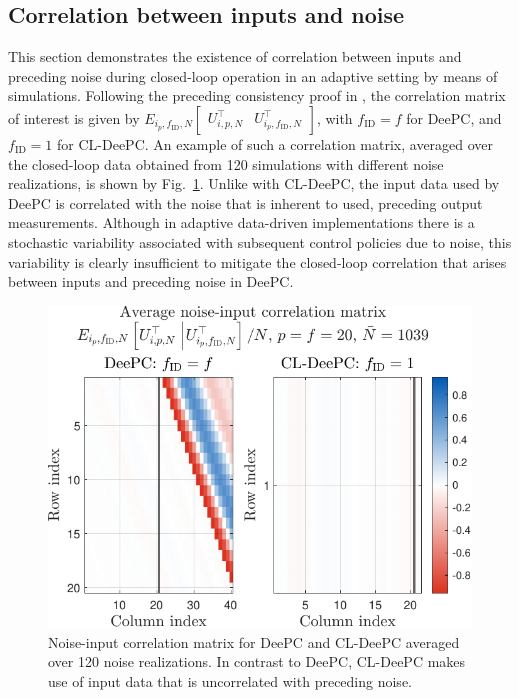 \subsection{Correlation between inputs and noise}
\noindent This section demonstrates the existence of correlation between inputs and preceding noise during closed-loop operation in an adaptive setting by means of simulations. Following the preceding consistency proof in , the correlation matrix of interest is given by $E_{i_p,f_\mathrm{ID},N}\begin{bmatrix}U_{i,p,N}^\top & U_{i_p,f_\mathrm{ID},N}^\top\end{bmatrix}$, with $f_\mathrm{ID}=f$ for \ac{DeePC}, and $f_\mathrm{ID}=1$ for \ac{CL-DeePC}. An example of such a correlation matrix, averaged over the closed-loop data obtained from 120 simulations with different noise realizations, is shown by Fig.~\ref{fig:EfUpf_correlation}. Unlike with \ac{CL-DeePC}, the input data used by \ac{DeePC} is correlated with the noise that is inherent to used, preceding output measurements. Although in adaptive data-driven implementations there is a stochastic variability associated with subsequent control policies due to noise, this variability is clearly insufficient to mitigate the closed-loop correlation that arises between inputs and preceding noise in \ac{DeePC}.
\begin{figure}[t!]
\begin{center}
\includegraphics[width=\columnwidth]{results/figures/Correlation_Nbar_1039_p_20_f_20_Re_1_Ru_1_Rdu_0_Q_100_R_0_dR_10.pdf}    %
\caption{Noise-input correlation matrix for \ac{DeePC} and \ac{CL-DeePC} averaged over 120 noise realizations. In contrast to \ac{DeePC}, \ac{CL-DeePC} makes use of input data that is uncorrelated with preceding noise.}  %
\label{fig:EfUpf_correlation}                                 %
\end{center}                                 %
\end{figure}

